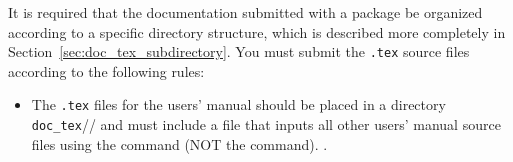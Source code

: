 It is required that the documentation submitted with a package be organized
according to a specific directory structure, which is described more
completely in Section~\ref{sec:doc_tex_subdirectory}.  You must submit
the {\tt .tex} source files according to the following rules:
\begin{itemize}  
   \item The {\tt .tex} files for the users' manual%
          should be placed in a 
         directory \verb|doc_tex|//%
         and must include a file 
         that inputs all other users' 
         manual source files using the \verb|| command (NOT the
         \verb|| command).%
         .


\end{itemize}
